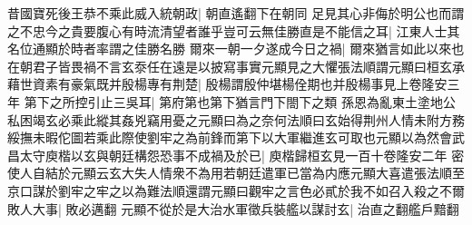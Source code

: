昔國寶死後王恭不乘此威入統朝政|{
	朝直遙翻下在朝同}
足見其心非侮於明公也而謂之不忠今之貴要腹心有時流清望者誰乎豈可云無佳勝直是不能信之耳|{
	江東人士其名位通顯於時者率謂之佳勝名勝}
爾來一朝一夕遂成今日之禍|{
	爾來猶言如此以來也}
在朝君子皆畏禍不言玄沗任在遠是以披寫事實元顯見之大懼張法順謂元顯曰桓玄承藉世資素有豪氣既并殷楊專有荆楚|{
	殷楊謂殷仲堪楊佺期也并殷楊事見上卷隆安三年}
第下之所控引止三吳耳|{
	第府第也第下猶言門下閤下之類}
孫恩為亂東土塗地公私困竭玄必乘此縱其姦兇竊用憂之元顯曰為之奈何法順曰玄始得荆州人情未附方務綏撫未暇佗圖若乘此際使劉牢之為前鋒而第下以大軍繼進玄可取也元顯以為然會武昌太守庾楷以玄與朝廷構怨恐事不成禍及於已|{
	庾楷歸桓玄見一百十卷隆安二年}
密使人自結於元顯云玄大失人情衆不為用若朝廷遣軍已當為内應元顯大喜遣張法順至京口謀於劉牢之牢之以為難法順還謂元顯曰觀牢之言色必貳於我不如召入殺之不爾敗人大事|{
	敗必邁翻}
元顯不從於是大治水軍徵兵裝艦以謀討玄|{
	治直之翻艦戶黯翻}


